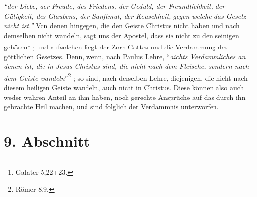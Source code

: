 \textit{"`der Liebe, der Freude, des Friedens, der Geduld, der
Freundlichkeit, der Gütigkeit, des Glaubens, der Sanftmut, der Keuschheit,
gegen welche das Gesetz nicht ist."'}
Von denen hingegen, die den Geiste Christus nicht haben und nach demselben nicht
wandeln, sagt uns der Apostel, dass sie nicht zu den seinigen
gehören\footnote{Galater 5,22+23.}
;
und aufsolchen liegt der Zorn Gottes
und die Verdammung des göttlichen Gesetzes. 
Denn, wenn, nach Paulus Lehre, "`\textit{nichts Verdammliches an denen ist, die
in Jesus Christus sind, die nicht nach dem Fleische, sondern nach dem Geiste
wandeln}"'\footnote{Römer 8,9.} ;
so sind, nach derselben Lehre, diejenigen, die nicht nach diesem heiligen Geiste
wandeln, auch nicht in Christus.
Diese können also auch weder wahren Anteil an ihm haben, noch gerechte
Ansprüche auf das durch ihn gebrachte Heil machen, und sind folglich der
Verdammnis unterworfen. 

\section{9. Abschnitt} \label{kap1_ab9}

